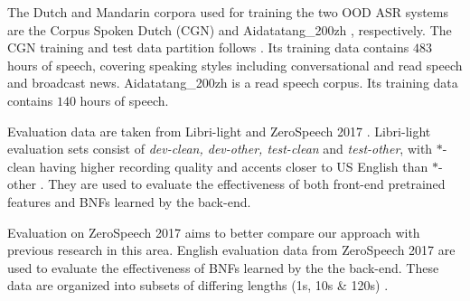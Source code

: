 \documentclass[a4paper]{article}
\begin{document}
The Dutch and Mandarin corpora used for training the two OOD ASR systems are the Corpus Spoken Dutch (CGN) \cite{oostdijk2000spoken} and Aidatatang\_200zh \cite{aidatatang}, respectively. 
The CGN   training and test data partition follows \cite{laurensw75cgn_kaldi}. Its training data contains $483$ hours of speech, covering speaking styles including conversational and read speech and broadcast news.
Aidatatang\_200zh is a read speech   corpus.
Its training data contains $140$ hours of speech.   

Evaluation data are taken from  Libri-light and ZeroSpeech 2017 \cite{dunbar2017zero}. 
 Libri-light evaluation sets consist of \textit{dev-clean, dev-other, test-clean} and \textit{test-other}, 
with 
$*$-clean 
having higher recording quality and accents closer to US English than  
$*$-other 
\cite{panayotov2015librispeech}.
They are used to evaluate the effectiveness of  both front-end pretrained features and  BNFs learned by the back-end.

Evaluation on ZeroSpeech 2017 aims  to better compare our approach with previous research in this area.
English evaluation data from ZeroSpeech 2017 are used to evaluate the effectiveness of BNFs learned by the the back-end. These data are organized into subsets of differing   lengths (1s, 10s \& 120s)  \cite{dunbar2017zero}.

\end{document}
